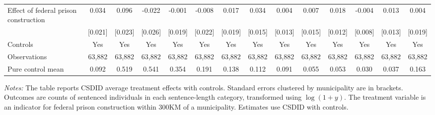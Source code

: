 \begin{table}[!htpb]
\begin{threeparttable}
\begin{adjustbox}{max width=\textwidth}
\begin{tabular}{@{\extracolsep{0pt}}lccccccccccccc}
\hline
Effect of federal prison construction & 0.034 & 0.096 & -0.022 & -0.001 & -0.008 & 0.017 & 0.034 & 0.004 & 0.007 & 0.018 & -0.004 & 0.013 & 0.004 \\
 & [0.021] & [0.023] & [0.026] & [0.019] & [0.022] & [0.019] & [0.015] & [0.013] & [0.015] & [0.012] & [0.008] & [0.013] & [0.019] \\
Controls & Yes & Yes & Yes & Yes & Yes & Yes & Yes & Yes & Yes & Yes & Yes & Yes & Yes \\
Observations & 63,882 & 63,882 & 63,882 & 63,882 & 63,882 & 63,882 & 63,882 & 63,882 & 63,882 & 63,882 & 63,882 & 63,882 & 63,882 \\
Pure control mean & 0.092 & 0.519 & 0.541 & 0.354 & 0.191 & 0.138 & 0.112 & 0.091 & 0.055 & 0.053 & 0.030 & 0.037 & 0.163 \\
\hline\hline
\end{tabular}
\end{adjustbox}
\begin{minipage}{0.95\textwidth}
\footnotesize \emph{Notes:} The table reports CSDID average treatment effects with controls. Standard errors clustered by municipality are in brackets. Outcomes are counts of sentenced individuals in each sentence-length category, transformed using \(\log(1+y)\). The treatment variable is an indicator for federal prison construction within 300KM of a municipality. Estimates use CSDID with controls.
\end{minipage}
\end{threeparttable}
\end{table}

